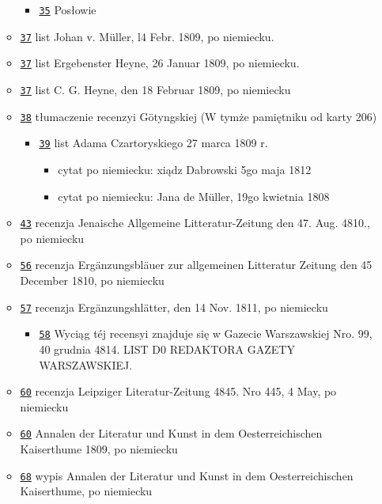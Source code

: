 \documentclass[12]{mwart}
\begin{document}
\begin{itemize}
\begin{itemize}
\begin{itemize}
     \item \href{\pavia{6-1}{37}}{\texttt{35}} Posłowie 
     \end{itemize}
   \item \href{\pavia{6-1}{39}}{\texttt{37}} list Johan v. Müller, l4 Febr. 1809, po niemiecku.
   \item \href{\pavia{6-1}{39}}{\texttt{37}} list Ergebenster Heyne,
     26 Januar 1809, po niemiecku.  
   \item \href{\pavia{6-1}{39}}{\texttt{37}} list C. G. Heyne, den 18 Februar 1809, po niemiecku
   \item \href{\pavia{6-1}{40}}{\texttt{38}} tłumaczenie recenzyi Götyngskiej (W tymże pamiętniku od karty 206)
     \begin{itemize}
     \item \href{\pavia{6-1}{41}}{\texttt{39}} list Adama
       Czartoryskiego 27 marca 1809 r.
       \begin{itemize}
       \item cytat po niemiecku: xiądz Dabrowski 5go maja 1812
       \item cytat po niemiecku: Jana de Müller, 19go kwietnia 1808
       \end{itemize}
     \end{itemize}
     \item \href{\pavia{6-1}{45}}{\texttt{43}} recenzja Jenaische Allgemeine Litteratur-Zeitung den 47. Aug. 4810., po niemiecku
     \item \href{\pavia{6-1}{58}}{\texttt{56}} recenzja Ergänzungsbläuer zur allgemeinen Litteratur Zeitung den 45 December 1810, po niemiecku
     \item \href{\pavia{6-1}{59}}{\texttt{57}} recenzja Ergänzungshlätter, den 14 Nov. 1811, po niemiecku
       \begin{itemize}
       \item \href{\pavia{6-1}{60}}{\texttt{58}} Wyciąg téj recensyi znajduje się w Gazecie Warszawskiej
         Nro. 99, 40 grudnia 4814.  LIST D0 REDAKTORA GAZETY
         WARSZAWSKIEJ.
       \end{itemize}
     \item \href{\pavia{6-1}{62}}{\texttt{60}} recenzja Leipziger Literatur-Zeitung 4845. Nro 445, 4 May, po niemiecku
     \item \href{\pavia{6-1}{62}}{\texttt{60}} Annalen der Literatur und Kunst in dem Oesterreichischen Kaiserthume 1809, po niemiecku
     \item \href{\pavia{6-1}{70}}{\texttt{68}} wypis Annalen der Literatur und Kunst in dem Oesterreichischen Kaiserthume, po niemiecku

\end{itemize}
\end{itemize}
\end{document}
